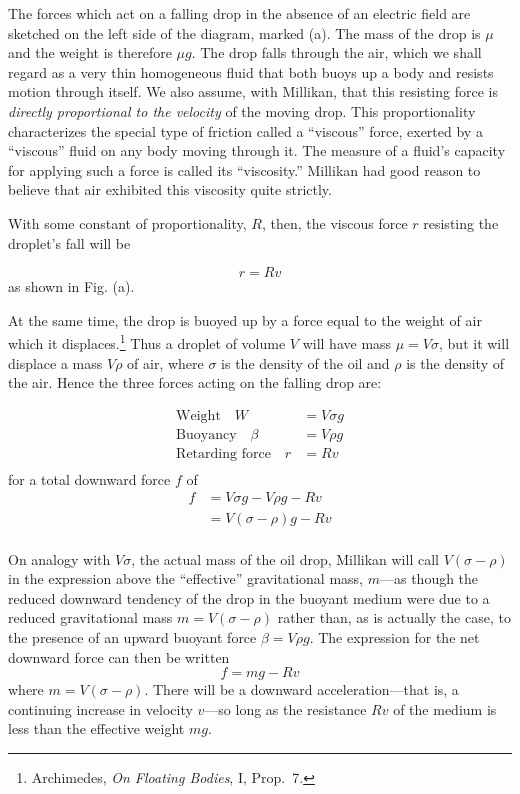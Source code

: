 The forces which act on a falling drop in the absence of an electric
field are sketched on the left side of the diagram, marked (a). The mass 
of the drop is $\mu$ and the weight is therefore $\mu g$. The drop falls 
through the air, which we shall regard as a very thin homogeneous fluid that 
both buoys up a body and resists motion through itself. We also assume, with 
Millikan, that this resisting force is \emph{directly proportional to the 
velocity} of the moving drop. This proportionality characterizes the special 
type of friction called a ``viscous'' force, exerted by a ``viscous'' fluid 
on any body moving through it. The measure of a fluid's capacity for
applying such a force is called its ``viscosity.'' Millikan had good
reason to believe that air exhibited this viscosity quite strictly.

With some constant of proportionality, $R$, then, the viscous force
$r$ resisting the droplet's fall will be

\begin{equation*}\tag{3.1}
r = Rv
\end{equation*}
%
as shown in Fig. (a).

At the same time, the drop is buoyed up by a force equal to the weight
of air which it displaces.\footnote{Archimedes, \emph{On Floating
  Bodies}, I, Prop.\ 7.} Thus a droplet of volume $V$ will have mass
$\mu = V\sigma$, but it will displace a mass $V\rho$ of air,
where $\sigma$ is the density of the oil and $\rho$ is the density of
the air. Hence the three forces acting on the falling drop are:

\begin{align*}
\text{Weight}\quad W & = V\sigma g\\
\text{Buoyancy}\quad \beta & = V\rho g\\
\text{Retarding force}\quad r &= Rv\\
\end{align*}
%
for a total downward force $f$ of
%
\begin{align*}
f &= V\sigma g-V\rho g-Rv\\
 &= V(\sigma-\rho)g-Rv\\
\end{align*}

On analogy with $V\sigma$, the actual mass of the oil drop, Millikan
will call $V(\sigma-\rho)$ in the expression above the
``effective'' grav\-i\-ta\-tion\-al mass, $m$---as though the reduced
downward tendency of the drop in the buoyant medium were due to a
reduced grav\-i\-ta\-tion\-al mass $m = V(\sigma-\rho)$
rather than, as is actually the case, to the presence of an upward
buoyant force $\beta = V\rho g$. The expression for the net downward
force can then be written
\begin{equation*}\tag{3.2}
f = mg - Rv
\end{equation*}
where $m = V(\sigma-\rho)$. There will be a downward
acceleration---that is, a continuing increase in velocity $v$---so
long as the resistance $Rv$ of the medium is less than the
effective weight $mg$.

